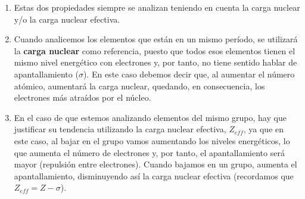 \begin{consejo}
    \begin{enumerate}
        \item Estas dos propiedades siempre se analizan teniendo en cuenta la carga nuclear y/o la carga nuclear efectiva.
        \item Cuando analicemos los elementos que están en un mismo período, se utilizará la \textbf{carga nuclear} como referencia, puesto que todos esos elementos tienen el mismo nivel energético con electrones y, por tanto, no tiene sentido hablar de apantallamiento (\(\sigma\)). En este caso debemos decir que, al aumentar el número atómico, aumentará la carga nuclear, quedando, en consecuencia, los electrones más atraídos por el núcleo.
        \item En el caso de que estemos analizando elementos del mismo grupo, hay que justificar su tendencia utilizando la carga nuclear efectiva, \(Z_{eff}\), ya que en este caso, al bajar en el grupo vamos aumentando los niveles energéticos, lo que aumenta el número de electrones y, por tanto, el apantallamiento será mayor (repulsión entre electrones).
        Cuando bajamos en un grupo, aumenta el apantallamiento, disminuyendo así la carga nuclear efectiva (recordamos que \(Z_{eff} = Z - \sigma\)).
    \end{enumerate}
\end{consejo}


